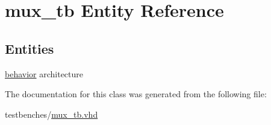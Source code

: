 \hypertarget{classmux__tb}{\section{mux\-\_\-tb \-Entity \-Reference}
\label{classmux__tb}
}
\subsection*{\-Entities}
\begin{DoxyCompactItemize}
\item 
\hyperlink{classmux__tb_1_1behavior}{behavior} architecture
\end{DoxyCompactItemize}


\-The documentation for this class was generated from the following file\-:\begin{DoxyCompactItemize}
\item 
testbenches/\hyperlink{mux__tb_8vhd}{mux\-\_\-tb.\-vhd}\end{DoxyCompactItemize}
